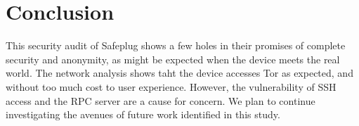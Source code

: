 \section{Conclusion}
\label{sec:conclusion}
This security audit of Safeplug shows a few holes in their promises of complete security and anonymity, as might be expected when the device meets the real world.  The network analysis shows taht the device accesses Tor as expected, and without too much cost to user experience.  However, the vulnerability of SSH access and the RPC server are a cause for concern.  We plan to continue investigating the avenues of future work identified in this study.
